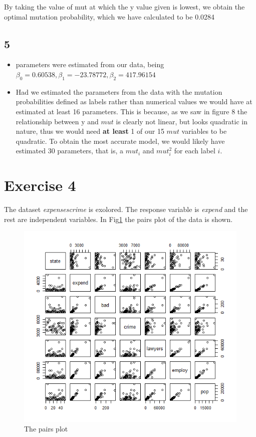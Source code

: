 \documentclass{article}
\begin{document}
    By taking the value of mut at which the y value given is lowest, we obtain the optimal mutation probability, which we have calculated to be 0.0284
    \subsection*{5}
    \begin{itemize}
    \item parameters were estimated from our data, being $\beta_0=0.60538, \beta_1=-23.78772, \beta_2=417.96154$
    \item Had we estimated the parameters from the data with the mutation probabilities defined as labels rather than numerical values we would have at estimated at least 16 parameters. This is because, as we saw in figure 8 the relationship between y and $mut$ is clearly not linear, but looks quadratic in nature, thus we would need \textbf{at least} 1 of our 15 $mut$ variables to be quadratic. To obtain the most accurate model, we would likely have estimated 30 parameters, that is, a $mut_i$ and $mut_i^2$ for each label $i$.
    \end{itemize}

  \section*{Exercise 4}
    The dataset \textit{expensescrime} is exolored.
    The response variable is \textit{expend} and the rest are independent variables.
    In Fig\ref{fig:PairsCrime} the pairs plot of the data is shown.
    
        \begin{figure}[H]
        \centering
        \includegraphics[scale=0.6]{../results/4_pairs.png}
        \caption{The pairs plot}
        \label{fig:PairsCrime}
    \end{figure}
    
\end{document}
